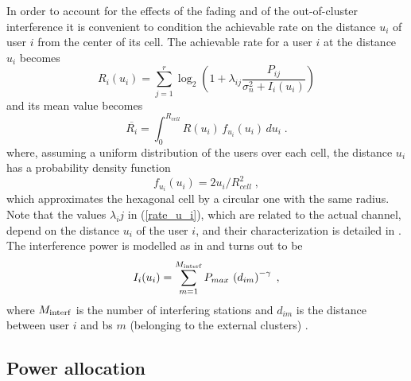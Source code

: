 In order to account for the effects of the fading and of the out-of-cluster interference it is convenient to condition the achievable rate on the distance $u_i$ of user $i$ from the center of its cell. The achievable rate for a user $i$ at the distance $u_i$ becomes 
\begin{equation}
 {R_i}(u_i)= \sum_{j=1}^{r} \log_2\left(1+\lambda_{ij}\frac{P_{ij}}{\sigma_n^2+I_i(u_i)}\right)\label{rate_u_i}
\end{equation}
and its mean value becomes
\begin{equation}
 \overline{R_i}=\int_0^{R_{cell}} R(u_i) \,f_{u_i}(u_i)\,du_i\;.\label{rates1inte}
\end{equation}
where, assuming a uniform distribution of the users over each cell, the distance $u_i$ has a probability density function
\begin{equation}
    f_{u_i}(u_i)=2u_i/R_{cell}^2\;, \label{density_d}
\end{equation}
which approximates the hexagonal cell by a circular one with the same radius. Note that the values $\lambda_ij$ in (\ref{rate_u_i}), which are related to the actual channel, depend on the distance $u_i$ of the user $i$, and their characterization is detailed in \cite{corvaja13b}.
The interference power is modelled as in \cite{corvaja13b} and turns out to be
\begin{equation}
      I_i(u_i) = \sum_{m=1}^{M_{\rm interf}} P_{max}\, \left(d_{im}\right)^{-\gamma}\;,\label{interfexact}
\end{equation}
where $M_{\rm interf}$ is the number of interfering stations and $d_{im}$ is the distance between user $i$ and \gls{bs} $m$ (belonging to the external clusters) \cite{corvaja13b}.


\subsection{Power allocation}

